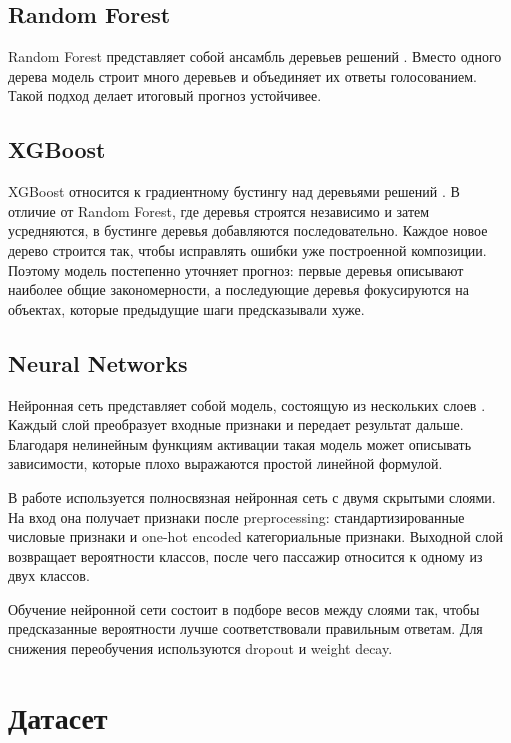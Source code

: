 \documentclass[14pt,a4paper]{extreport}
\begin{document}
\section{Random Forest}
Random Forest представляет собой ансамбль деревьев решений \cite{breiman-rf}. Вместо одного дерева модель строит много деревьев и объединяет их ответы голосованием. Такой подход делает итоговый прогноз устойчивее.

\section{XGBoost}
XGBoost относится к градиентному бустингу над деревьями решений \cite{xgboost}. В отличие от Random Forest, где деревья строятся независимо и затем усредняются, в бустинге деревья добавляются последовательно. Каждое новое дерево строится так, чтобы исправлять ошибки уже построенной композиции. Поэтому модель постепенно уточняет прогноз: первые деревья описывают наиболее общие закономерности, а последующие деревья фокусируются на объектах, которые предыдущие шаги предсказывали хуже.

\section{Neural Networks}
Нейронная сеть представляет собой модель, состоящую из нескольких слоев \cite{bishop}. Каждый слой преобразует входные признаки и передает результат дальше. Благодаря нелинейным функциям активации такая модель может описывать зависимости, которые плохо выражаются простой линейной формулой.

В работе используется полносвязная нейронная сеть с двумя скрытыми слоями. На вход она получает признаки после preprocessing: стандартизированные числовые признаки и one-hot encoded категориальные признаки. Выходной слой возвращает вероятности классов, после чего пассажир относится к одному из двух классов.

Обучение нейронной сети состоит в подборе весов между слоями так, чтобы предсказанные вероятности лучше соответствовали правильным ответам. Для снижения переобучения используются dropout и weight decay.


\chapter{Датасет}
\end{document}
